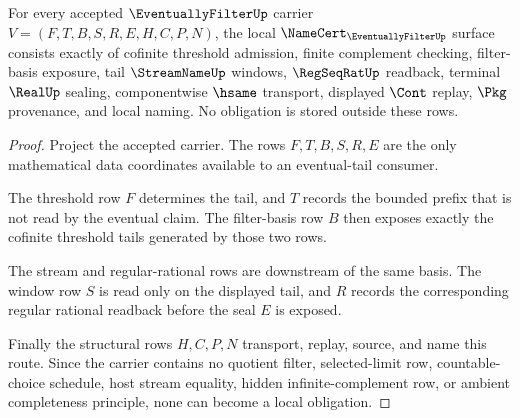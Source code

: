 \begin{theorem}
\label{thm:eventually-filter-namecert-obligations}
For every accepted $\EventuallyFilterUp$ carrier $V=(F,T,B,S,R,E,H,C,P,N)$, the local $\NameCert_{\EventuallyFilterUp}$ surface consists exactly of cofinite threshold admission, finite complement checking, filter-basis exposure, tail $\StreamNameUp$ windows, $\RegSeqRatUp$ readback, terminal $\RealUp$ sealing, componentwise $\hsame$ transport, displayed $\Cont$ replay, $\Pkg$ provenance, and local naming. No obligation is stored outside these rows.
\end{theorem}
\begin{proof}
Project the accepted carrier. The rows $F,T,B,S,R,E$ are the only mathematical data coordinates available to an eventual-tail consumer.

The threshold row $F$ determines the tail, and $T$ records the bounded prefix that is not read by the eventual claim. The filter-basis row $B$ then exposes exactly the cofinite threshold tails generated by those two rows.

The stream and regular-rational rows are downstream of the same basis. The window row $S$ is read only on the displayed tail, and $R$ records the corresponding regular rational readback before the seal $E$ is exposed.

Finally the structural rows $H,C,P,N$ transport, replay, source, and name this route. Since the carrier contains no quotient filter, selected-limit row, countable-choice schedule, host stream equality, hidden infinite-complement row, or ambient completeness principle, none can become a local obligation.
\end{proof}

